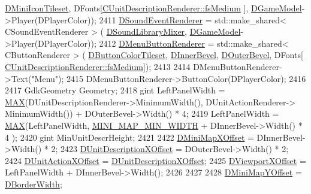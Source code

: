 \begin{DoxyCode}
      \hyperlink{classCApplicationData_aa7d7e4c8be514246089546f4d98d74f2}{DMiniIconTileset}, DFonts[\hyperlink{classCUnitDescriptionRenderer_a3ea4cd83b6dd9533ab3abb953a7da35aa7b5aa12d8a01b317ebfbf1bd65d7e568}{CUnitDescriptionRenderer::fsMedium}
      ], \hyperlink{classCApplicationData_a32b50c7c1cbac3cfd67c7f775b1d6fee}{DGameModel}->Player(DPlayerColor));
2411     \hyperlink{classCApplicationData_af2959556fc881145d9d777c627a9345d}{DSoundEventRenderer} = std::make\_shared< CSoundEventRenderer > (
      \hyperlink{classCApplicationData_aa1e6876121bb4fb229ec6b930a8a6766}{DSoundLibraryMixer}, \hyperlink{classCApplicationData_a32b50c7c1cbac3cfd67c7f775b1d6fee}{DGameModel}->Player(DPlayerColor));
2412     \hyperlink{classCApplicationData_a2c9f10aa452454a016e0164f6ce777a6}{DMenuButtonRenderer} = std::make\_shared< CButtonRenderer > (
      \hyperlink{classCApplicationData_a7482e0b4d7e0ce4979eb9f28872023ad}{DButtonColorTileset}, \hyperlink{classCApplicationData_a29a687c44dceb9e87a56d96612d59ab5}{DInnerBevel}, \hyperlink{classCApplicationData_abc2b04aa05148da81145ff6d6bc2bf01}{DOuterBevel}, DFonts[
      \hyperlink{classCUnitDescriptionRenderer_a3ea4cd83b6dd9533ab3abb953a7da35aa7b5aa12d8a01b317ebfbf1bd65d7e568}{CUnitDescriptionRenderer::fsMedium}]);
2413     
2414     DMenuButtonRenderer->Text(\textcolor{stringliteral}{"Menu"});
2415     DMenuButtonRenderer->ButtonColor(DPlayerColor);
2416     
2417     GdkGeometry Geometry; 
2418     gint LeftPanelWidth = \hyperlink{main_8cpp_afa99ec4acc4ecb2dc3c2d05da15d0e3f}{MAX}(DUnitDescriptionRenderer->MinimumWidth(), DUnitActionRenderer->
      MinimumWidth()) + DOuterBevel->Width() * 4;
2419     LeftPanelWidth = \hyperlink{main_8cpp_afa99ec4acc4ecb2dc3c2d05da15d0e3f}{MAX}(LeftPanelWidth, \hyperlink{main_8cpp_a8f16b3eaa5b816dcfd2f60cdc4733a18}{MINI\_MAP\_MIN\_WIDTH} + DInnerBevel->Width() * 4
      );
2420     gint MinUnitDescrHeight;
2421     
2422     \hyperlink{classCApplicationData_ae651b9d3963288c5c1f5aaf53bf9401d}{DMiniMapXOffset} = DInnerBevel->Width() * 2;
2423     \hyperlink{classCApplicationData_a5653b5d0eff32ccd540ad60f5c331c24}{DUnitDescriptionXOffset} = DOuterBevel->Width() * 2;
2424     \hyperlink{classCApplicationData_aa47b53d283617575a4866c08d83e27c4}{DUnitActionXOffset} = \hyperlink{classCApplicationData_a5653b5d0eff32ccd540ad60f5c331c24}{DUnitDescriptionXOffset};
2425     \hyperlink{classCApplicationData_a306bba873ccc47126111305fe21ef3ff}{DViewportXOffset} = LeftPanelWidth + DInnerBevel->Width();
2426     
2427     
2428     \hyperlink{classCApplicationData_ad33fc850bd8262a4bdf1f23e9477d5ad}{DMiniMapYOffset} = \hyperlink{classCApplicationData_a566b69c72fa982c6ecf8e47dc21df489}{DBorderWidth};

\end{DoxyCode}
